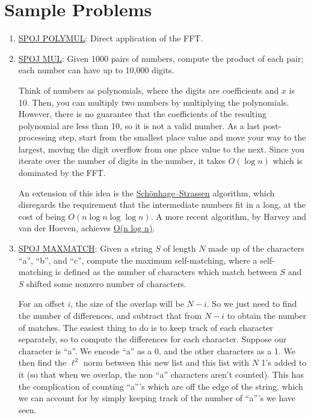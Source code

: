 \documentclass[11pt, oneside]{article}
\theoremstyle{plain}
\theoremstyle{definition}
\begin{document}
\newpage

\section{Sample Problems}

\begin{enumerate}
  \item \href{https://www.spoj.com/problems/POLYMUL/}{SPOJ POLYMUL}:
    Direct application of the FFT.

  \item \href{https://www.spoj.com/problems/MUL/}{SPOJ MUL}:
    Given 1000 pairs of numbers, compute the product of each pair;
    each number can have up to 10,000 digits.

    Think of numbers as polynomials, where the digits are coefficients and
    \( x \) is 10. Then, you can multiply two numbers by multiplying the
    polynomials. However, there is no guarantee that the coefficients
    of the resulting polynomial are less than 10, so it is not a valid number.
    As a last post-processing step, start from the smallest place value
    and move your way to the largest, moving the digit overflow from one place
    value to the next. Since you iterate over the number of digits in the
    number, it takes \( O(\log n) \) which is dominated by the FFT.
    
    An extension of this idea is the 
    \href{https://en.wikipedia.org/wiki/Sch%C3%B6nhage%E2%80%93Strassen_algorithm}
    {Schönhage–Strassen} algorithm, which disregards the requirement
    that the intermediate numbers fit in a long, at the cost of being
    \( O(n \log n \log \log n) \). A more recent algorithm,
    by Harvey and van der Hoeven, achieves 
    \href{https://hal.archives-ouvertes.fr/hal-02070778/document}{O(n log n)}.

  \item \href{https://www.spoj.com/problems/MAXMATCH/}{SPOJ MAXMATCH}:
    Given a string \( S \) of length \( N \) made up of the characters
    \enquote{a}, \enquote{b}, and \enquote{c}, compute the maximum
    self-matching, where a self-matching is defined as the number of characters
    which match between \( S \) and \( S \) shifted some
    nonzero number of characters.

    For an offset \( i \), the size of the overlap will be \( N - i \).
    So we just need to find the number of differences, and subtract that
    from \( N - i \) to obtain the number of matches.
    The easiest thing to do is to keep track of each character separately,
    so to compute the differences for each character.
    Suppose our character is \enquote{a}. We encode \enquote{a} as a 0,
    and the other characters as a 1. We then find the \( \ell^2 \) norm between 
    this new list and this list with \( N \) 1's added to it
    (so that when we overlap, the non \enquote{a} characters aren't counted).
    This has the complication of counting \enquote{a}'s which are off the edge
    of the string, which we can account for by simply keeping track of the 
    number of \enquote{a}'s we have seen.


\end{enumerate}
\end{document}
